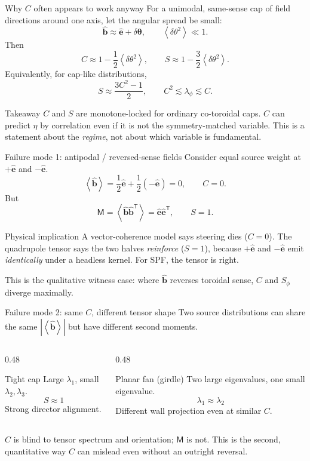 \documentclass[aspectratio=169]{beamer}
\newcommand{\bb}{\hat{\bm b}}
\newcommand{\be}{\hat{\bm e}}
\newcommand{\T}{\mathsf T}
\newcommand{\avg}[1]{\left\langle #1 \right\rangle}
\newcommand{\M}{\mathsf M}
\newcommand{\Sphi}{S_\phi}
\newcommand{\lamphi}{\lambda_\phi}
\begin{document}
\begin{frame}[t]{Why $C$ often appears to work anyway}
For a unimodal, same-sense cap of field directions around one axis, let the angular spread be small:
\[
\bb \approx \be + \delta\bm\theta,
\qquad
\avg{\delta\theta^2}\ll 1.
\]
Then
\[
C \approx 1-\frac{1}{2}\avg{\delta\theta^2},
\qquad
S \approx 1-\frac{3}{2}\avg{\delta\theta^2}.
\]
Equivalently, for cap-like distributions,
\[
S \approx \frac{3C^2-1}{2}, \qquad C^2 \lesssim \lamphi \lesssim C .
\]
\begin{block}{Takeaway}
$C$ and $S$ are monotone-locked for ordinary co-toroidal caps. $C$ can predict $\eta$ by correlation even if it is not the symmetry-matched variable. This is a statement about the \emph{regime}, not about which variable is fundamental.
\end{block}
\end{frame}

\begin{frame}[t]{Failure mode 1: antipodal / reversed-sense fields}
Consider equal source weight at $+\be$ and $-\be$.
\[
\avg{\bb}=\frac{1}{2}\be+\frac{1}{2}(-\be)=0,
\qquad
C=0.
\]
But
\[
\M=\avg{\bb\bb^\T}=\be\be^\T,
\qquad
S=1.
\]
\begin{block}{Physical implication}
A vector-coherence model says steering dies ($C=0$). The quadrupole tensor says the two halves \emph{reinforce} ($S=1$), because $+\be$ and $-\be$ emit \emph{identically} under a headless kernel. For SPF, the tensor is right.
\end{block}
This is the qualitative witness case: where $\bb$ reverses toroidal sense, $C$ and $\Sphi$ diverge maximally.
\end{frame}

\begin{frame}[t]{Failure mode 2: same $C$, different tensor shape}
Two source distributions can share the same $|\avg{\bb}|$ but have different second moments.
\vspace{0.5em}
\begin{columns}[T]
\begin{column}{0.48\textwidth}
\begin{block}{Tight cap}
Large $\lambda_1$, small $\lambda_2,\lambda_3$.
\[
S\approx 1
\]
Strong director alignment.
\end{block}
\end{column}
\begin{column}{0.48\textwidth}
\begin{block}{Planar fan (girdle)}
Two large eigenvalues, one small eigenvalue.
\[
\lambda_1\approx\lambda_2
\]
Different wall projection even at similar $C$.
\end{block}
\end{column}
\end{columns}
\vspace{0.5em}
$C$ is blind to tensor spectrum and orientation; $\M$ is not. This is the second, quantitative way $C$ can mislead even without an outright reversal.
\end{frame}
\end{document}
